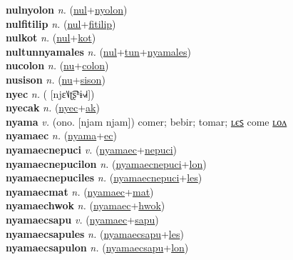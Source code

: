 \textbf{nulnyolon} \textit{n.} (\hyperref[nul]{nul}+\hyperref[nyolon]{nyolon})
 \label{nulnyolon} \\
\textbf{nulfitilip} \textit{n.} (\hyperref[nul]{nul}+\hyperref[fitilip]{fitilip})
 \label{nulfitilip} \\
\textbf{nulkot} \textit{n.} (\hyperref[nul]{nul}+\hyperref[kot]{kot})
 \label{nulkot} \\
\textbf{nultunnyamales} \textit{n.} (\hyperref[nul]{nul}+\hyperref[tun]{tun}+\hyperref[nyamales]{nyamales})
 \label{nultunnyamales} \\
\textbf{nucolon} \textit{n.} (\hyperref[nu]{nu}+\hyperref[colon]{colon})
 \label{nucolon} \\
\textbf{nusison} \textit{n.} (\hyperref[nu]{nu}+\hyperref[sison]{sison})
 \label{nusison} \\
\textbf{nyec} \textit{n.} ( [njɛ˥˩ʈ͡ʂʰɨ˧˩˧])
 \label{nyec} \\
\textbf{nyecak} \textit{n.} (\hyperref[nyec]{nyec}+\hyperref[ak]{ak})
 \label{nyecak} \\
\textbf{nyama} \textit{v.} (ono. [njam njam])
comer; bebir; tomar; \hyperref[nyamales]{ʟєꜱ} come \hyperref[nyamalon]{ʟᴏᴧ} \label{nyama} \\
\textbf{nyamaec} \textit{n.} (\hyperref[nyama]{nyama}+\hyperref[ec]{ec})
 \label{nyamaec} \\
\textbf{nyamaecnepuci} \textit{v.} (\hyperref[nyamaec]{nyamaec}+\hyperref[nepuci]{nepuci})
 \label{nyamaecnepuci} \\
\textbf{nyamaecnepucilon} \textit{n.} (\hyperref[nyamaecnepuci]{nyamaecnepuci}+\hyperref[lon]{lon})
 \label{nyamaecnepucilon} \\
\textbf{nyamaecnepuciles} \textit{n.} (\hyperref[nyamaecnepuci]{nyamaecnepuci}+\hyperref[les]{les})
 \label{nyamaecnepuciles} \\
\textbf{nyamaecmat} \textit{n.} (\hyperref[nyamaec]{nyamaec}+\hyperref[mat]{mat})
 \label{nyamaecmat} \\
\textbf{nyamaechwok} \textit{n.} (\hyperref[nyamaec]{nyamaec}+\hyperref[hwok]{hwok})
 \label{nyamaechwok} \\
\textbf{nyamaecsapu} \textit{v.} (\hyperref[nyamaec]{nyamaec}+\hyperref[sapu]{sapu})
 \label{nyamaecsapu} \\
\textbf{nyamaecsapules} \textit{n.} (\hyperref[nyamaecsapu]{nyamaecsapu}+\hyperref[les]{les})
 \label{nyamaecsapules} \\
\textbf{nyamaecsapulon} \textit{n.} (\hyperref[nyamaecsapu]{nyamaecsapu}+\hyperref[lon]{lon})
